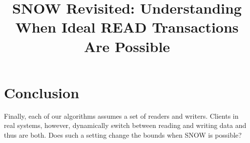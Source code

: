 \documentclass[a4paper,anonymous,USenglish]{lipics-v2019}
\title{SNOW Revisited: Understanding When Ideal READ Transactions Are Possible}
\begin{document}
\maketitle

\begin{abstract}
%

\end{abstract}




%









%
%
\section{Conclusion}

Finally, each of our algorithms assumes a set of readers and writers. Clients in real systems, however, dynamically 
switch between reading and writing data and thus are both. 
Does such a setting  change the bounds when SNOW is possible?
\end{document}
